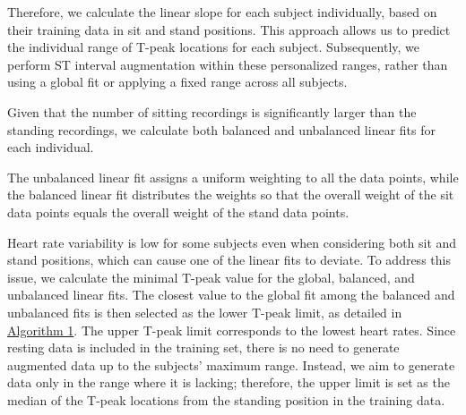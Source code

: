 Therefore, we calculate the linear slope for each subject individually, based on their training data in sit and stand positions. This approach allows us to predict the individual range of T-peak locations for each subject. Subsequently, we perform ST interval augmentation within these personalized ranges, rather than using a global fit or applying a fixed range across all subjects.

Given that the number of sitting recordings is significantly larger than the standing recordings, we calculate both balanced and unbalanced linear fits for each individual.

The unbalanced linear fit assigns a uniform weighting to all the data points, while the balanced linear fit distributes the weights so that the overall weight of the sit data points equals the overall weight of the stand data points.

Heart rate variability is low for some subjects even when considering both sit and stand positions, which can cause one of the linear fits to deviate.
To address this issue, we calculate the minimal T-peak value for the global, balanced, and unbalanced linear fits. The closest value to the global fit among the balanced and unbalanced fits is then selected as the lower T-peak limit, as detailed in \hyperlink{individual_augmentation}{Algorithm 1}.
The upper T-peak limit corresponds to the lowest heart rates. Since resting data is included in the training set, there is no need to generate augmented data up to the subjects' maximum range. Instead, we aim to generate data only in the range where it is lacking; therefore, the upper limit is set as the median of the T-peak locations from the standing position in the training data.

